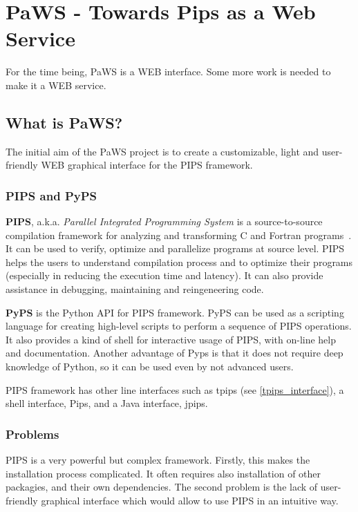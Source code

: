 \section{PaWS - Towards Pips as a Web Service}

For the time being, PaWS is a WEB interface. Some more work is needed
to make it a WEB service.


\subsection{What is PaWS?}

The initial aim of the PaWS project is to create a customizable, light and
user-friendly WEB graphical interface for the PIPS framework.

\subsubsection{PIPS and PyPS}
\label{pips_and_pyps}

{\bf PIPS}, a.k.a. \emph{Parallel Integrated Programming System} is a
source-to-source compilation framework for analyzing and transforming
C and Fortran programs~\cite{pips4u}. It can be used to verify, optimize and
parallelize programs at source level. PIPS helps the users to
understand compilation process and to optimize their programs
(especially in reducing the execution time and latency). It can also
provide assistance in debugging, maintaining and reingeneering code.

{\bf PyPS} is the Python API for PIPS framework. PyPS can be used as a
scripting language for creating high-level scripts to perform a
sequence of PIPS operations. It also provides a kind of shell for
interactive usage of PIPS, with on-line help and documentation. Another
advantage of Pyps is that it does not require deep knowledge of
Python, so it can be used even by not advanced users.

PIPS framework has other line interfaces such as tpips (see
\ref{tpips_interface}), a shell interface, Pips, and a Java interface,
jpips.


\subsubsection{Problems}

PIPS is a very powerful but complex framework. Firstly, this makes the
installation process complicated. It often requires also installation
of other packagies, and their own dependencies. The second problem is
the lack of user-friendly graphical interface which would allow to use
PIPS in an intuitive way.

